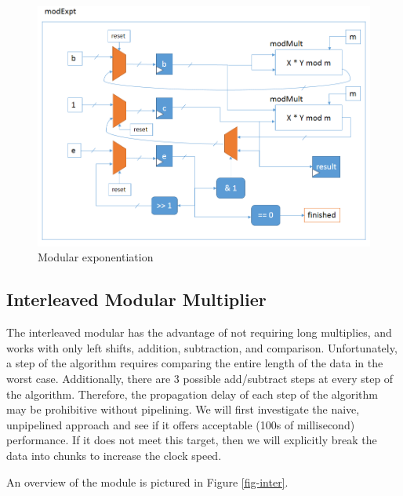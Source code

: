 \documentclass[12pt]{article}
\begin{document}
\begin{figure}
  \begin{centering}
    \includegraphics[width=\textwidth]{modexpt.png}
    \caption{Modular exponentiation}
    \label{fig-expt}
  \end{centering}
\end{figure}

\subsection{Interleaved Modular Multiplier}
The interleaved modular has the advantage of not requiring long multiplies, and works with
only left shifts, addition, subtraction, and comparison. Unfortunately, a step of the 
algorithm requires comparing the entire length of the data in the worst case. Additionally,
there are 3 possible add/subtract steps at every step of the algorithm. Therefore, the propagation delay
of each step of the algorithm may be prohibitive without pipelining. We will first investigate the
naive, unpipelined approach and see if it offers acceptable (100s of millisecond) performance. If it 
does not meet this target, then we will explicitly break the data into chunks to increase
the clock speed. 

An overview of the module is pictured in Figure \ref{fig-inter}.
\end{document}
